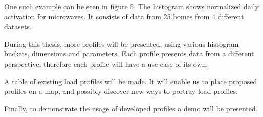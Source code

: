 One such example can be seen in figure 5. The histogram shows normalized daily 
activation for microwaves. It consists of data from 25 homes from 4 different
datasets. 

During this thesis, more profiles will be presented, using various histogram buckets, dimensions and parameters. 
Each profile presents data from a different perspective, therefore each profile will have a use case of its own.

A table of existing load profiles will be made. It will enable us to place proposed profiles on a map, and possibly 
discover new ways to portray load profiles.

Finally, to demonstrate the usage of developed profiles a demo will be presented. 



